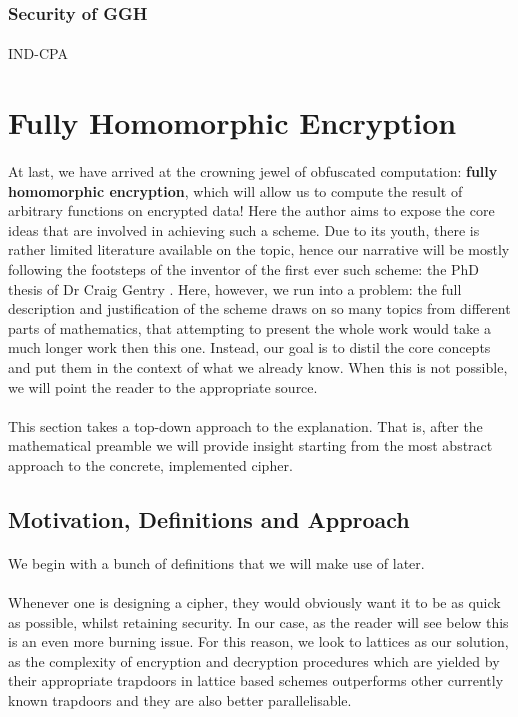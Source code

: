 \documentclass{article}
\theoremstyle{definition}
\theoremstyle{example}
\begin{document}
\subsubsection{Security of GGH}
\paragraph{} IND-CPA
\section{Fully Homomorphic Encryption}
\paragraph{} At last, we have arrived at the crowning jewel of obfuscated
computation: \textbf{fully homomorphic encryption}, which will allow us to
compute the result of arbitrary functions on encrypted data! Here the author
aims to expose the core ideas that are involved in achieving such a scheme. Due
to its youth, there is rather limited literature available on the topic, hence
our narrative will be mostly following the footsteps of the inventor of the first
ever such scheme: the PhD thesis of Dr Craig Gentry \cite{gentry2009fully}.
Here, however, we run into a problem: the full description and justification of
the scheme draws on so many topics from different parts of mathematics, that
attempting to present the whole work would take a much longer work then this
one. Instead, our goal is to distil the core concepts and put them in the
context of what we already know. When this is not possible, we will point the
reader to the appropriate source.
\paragraph{}
This section takes a top-down approach to the explanation. That is, after the mathematical
preamble we will provide insight starting from the most abstract approach to the
concrete, implemented cipher. 
\subsection{Motivation, Definitions and Approach}
\label{sec:fhe_motivation}
\paragraph{}
We begin with a bunch of definitions that we will make use of later.
\paragraph{} Whenever one is designing a cipher, they would obviously want it to
be as quick as possible, whilst retaining security. In our case, as the reader
will see below this is an even more burning issue. For this reason, we look to
lattices as our solution, as the complexity of encryption and decryption
procedures which are yielded by their appropriate trapdoors in lattice based
schemes outperforms other currently known trapdoors and they are also better
parallelisable.
\end{document}
